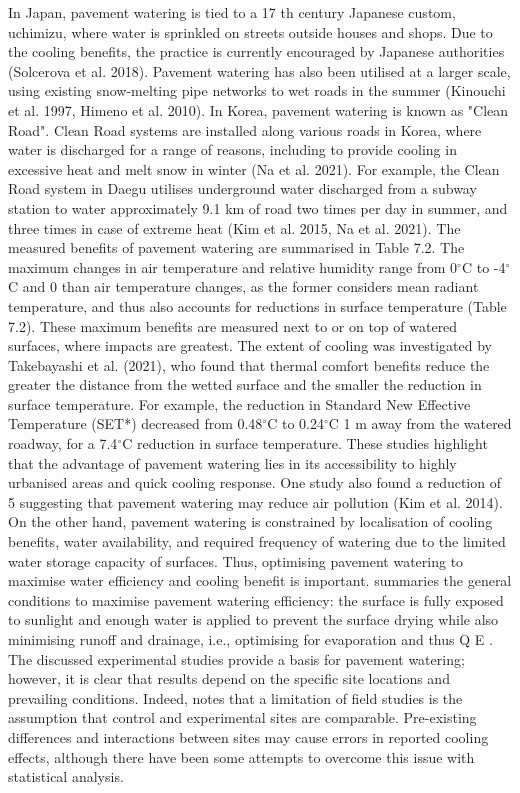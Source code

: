 \documentclass[final,3p,times,authoryear]{elsarticle}
\begin{document}
In Japan, pavement watering is tied to a 17 th century Japanese custom, uchimizu, where
water is sprinkled on streets outside houses and shops. Due to the cooling benefits, the
practice is currently encouraged by Japanese authorities (Solcerova et al. 2018).
Pavement watering has also been utilised at a larger scale, using existing snow-melting
pipe networks to wet roads in the summer (Kinouchi et al. 1997, Himeno et al. 2010).
In Korea, pavement watering is known as "Clean Road". Clean Road systems are
installed along various roads in Korea, where water is discharged for a range of reasons,
including to provide cooling in excessive heat and melt snow in winter (Na et al. 2021).
For example, the Clean Road system in Daegu utilises underground water discharged from a subway station to water approximately 9.1 km of road two times per day in
summer, and three times in case of extreme heat (Kim et al. 2015, Na et al. 2021).
The measured benefits of pavement watering are summarised in Table 7.2. The
maximum changes in air temperature and relative humidity range from 0$^{\circ}$C to -4$^{\circ}$C
and 0 %
than air temperature changes, as the former considers mean radiant temperature, and
thus also accounts for reductions in surface temperature (Table 7.2).
These maximum benefits are measured next to or on top of watered surfaces, where
impacts are greatest. The extent of cooling was investigated by Takebayashi et al.
(2021), who found that thermal comfort benefits reduce the greater the distance from the
wetted surface and the smaller the reduction in surface temperature. For example, the
reduction in Standard New Effective Temperature (SET*) decreased from 0.48$^{\circ}$C to
0.24$^{\circ}$C 1 m away from the watered roadway, for a 7.4$^{\circ}$C reduction in surface
temperature.
These studies highlight that the advantage of pavement watering lies in its accessibility
to highly urbanised areas and quick cooling response. One study also found a reduction
of 5 %
suggesting that pavement watering may reduce air pollution (Kim et al. 2014). On the
other hand, pavement watering is constrained by localisation of cooling benefits, water availability, and required frequency of watering due to the limited water storage
capacity of surfaces. Thus, optimising pavement watering to maximise water efficiency
and cooling benefit is important.
\cite{Hendel2020} summaries the general conditions to maximise pavement watering
efficiency: the surface is fully exposed to sunlight and enough water is applied to
prevent the surface drying while also minimising runoff and drainage, i.e., optimising
for evaporation and thus Q E .
The discussed experimental studies provide a basis for pavement watering; however, it
is clear that results depend on the specific site locations and prevailing conditions.
Indeed, \cite{Hendel2016} notes that a limitation of field studies is the assumption that
control and experimental sites are comparable. Pre-existing differences and interactions
between sites may cause errors in reported cooling effects, although there have been
some attempts to overcome this issue with statistical analysis.
\end{document}
